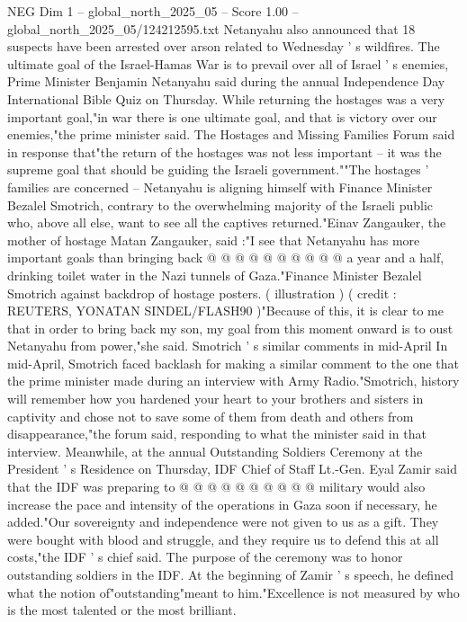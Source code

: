 \begin{textsample}{NEG Dim 1 – global\_north\_2025\_05 – Score 1.00 – global\_north\_2025\_05/124212595.txt}  \label{ex:f1_neg_078}
Netanyahu also announced that 18 suspects have been arrested over arson related to Wednesday ' s wildfires.
The ultimate goal of the Israel-Hamas War is to prevail over all of Israel ' s enemies, Prime Minister Benjamin Netanyahu said during the annual Independence Day International Bible Quiz on Thursday.
While returning the hostages was a very important goal,"in war there is one ultimate goal, and that is victory over our enemies,"the prime minister said.
The Hostages and Missing Families Forum said in response that"the return of the hostages was not less important -- it was the supreme goal that should be guiding the Israeli government.""The hostages ' families are concerned -- Netanyahu is aligning himself with Finance Minister Bezalel Smotrich, contrary to the overwhelming majority of the Israeli public who, above all else, want to see all the captives returned."Einav Zangauker, the mother of hostage Matan Zangauker, said :"I see that Netanyahu has more important goals than bringing back @ @ @ @ @ @ @ @ @ @ a year and a half, drinking toilet water in the Nazi tunnels of Gaza."Finance Minister Bezalel Smotrich against backdrop of hostage posters. ( illustration ) ( credit : REUTERS, YONATAN SINDEL/FLASH90 )"Because of this, it is clear to me that in order to bring back my son, my goal from this moment onward is to oust Netanyahu from power,"she said.
Smotrich ' s similar comments in mid-April In mid-April, Smotrich faced backlash for making a similar comment to the one that the prime minister made during an interview with Army Radio."Smotrich, history will remember how you hardened your heart to your brothers and sisters in captivity and chose not to save some of them from death and others from disappearance,"the forum said, responding to what the minister said in that interview.
Meanwhile, at the annual Outstanding Soldiers Ceremony at the President ' s Residence on Thursday, IDF Chief of Staff Lt.-Gen.
Eyal Zamir said that the IDF was preparing to @ @ @ @ @ @ @ @ @ @ military would also increase the pace and intensity of the operations in Gaza soon if necessary, he added."Our sovereignty and independence were not given to us as a gift.
They were bought with blood and struggle, and they require us to defend this at all costs,"the IDF ' s chief said.
The purpose of the ceremony was to honor outstanding soldiers in the IDF.
At the beginning of Zamir ' s speech, he defined what the notion of"outstanding"meant to him."Excellence is not measured by who is the most talented or the most brilliant.

\end{textsample}
